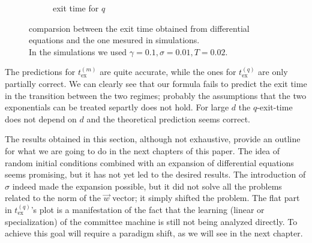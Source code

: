 \begin{figure}
\begin{subfigure}{0.495\textwidth}
    \caption{exit time for \(q\)}
  \end{subfigure}
  \caption{
    comparsion between the exit time obtained from differential equations and the one mesured in simulations. \\
    In the simulations we used \(\gamma=\num{0.1}, \sigma=\num{0.01}, T=\num{0.02}\).
  }
  \label{fig:sigma-phase-retrivial-exittimes}
\end{figure}
The predictions for \(t_\text{ex}^{(m)}\) are quite accurate,
while the ones for \(t_\text{ex}^{(q)}\) are only partially correct.
We can clearly see that our formula fails to predict the exit time in the transition
between the two regimes; probably the assumptions that the two exponentials can be treated separtly does not hold.
For large \(d\) the \(q\)-exit-time does not depend on \(d\) and the theoretical prediction seems correct.

The results obtained in this section, although not exhaustive,
provide an outline for what we are going to do in the next chapters of this paper.
The idea of random initial conditions combined with an expansion of differential equations seems promising,
but it has not yet led to the desired results.
The introduction of \(\sigma\) indeed made the expansion possible,
but it did not solve all the problems related to the norm of the \(\vec{w}\) vector;
it simply shifted the problem. 
The flat part in \(t_\text{ex}^{(q)}\)'s plot is a manifestation of the fact that the learning (linear or specialization) of the committee machine is still not being analyzed directly.
To achieve this goal will require a paradigm shift, as we will see in the next chapter.
